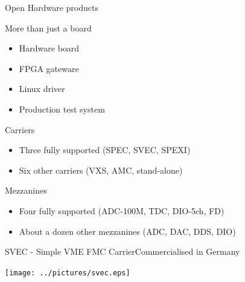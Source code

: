 \documentclass[compress,red]{beamer}
\begin{document}
\begin{frame}{Open Hardware products}

  \begin{block}{More than just a board}
    \begin{itemize}
    \item Hardware board
    \item FPGA gateware
    \item Linux driver
    \item Production test system
    \end{itemize}
  \end{block}

  \pause
  \begin{block}{Carriers}
    \begin{itemize}
    \item Three fully supported (SPEC, SVEC, SPEXI)
    \item Six other carriers (VXS, AMC, stand-alone)
    \end{itemize}
  \end{block}


  \pause
  \begin{block}{Mezzanines}
    \begin{itemize}
    \item Four fully supported (ADC-100M, TDC, DIO-5ch, FD)
    \item About a dozen other mezzanines (ADC, DAC, DDS, DIO)
    \end{itemize}
  \end{block}


  \note[item]{}

\end{frame}

\begin{frame}{SVEC - Simple VME FMC Carrier}{Commercialised in Germany}

  \begin{center}
    \texttt{[image: ../pictures/svec.eps]}
  \end{center}

  \note[item]{}

\end{frame}
\end{document}
